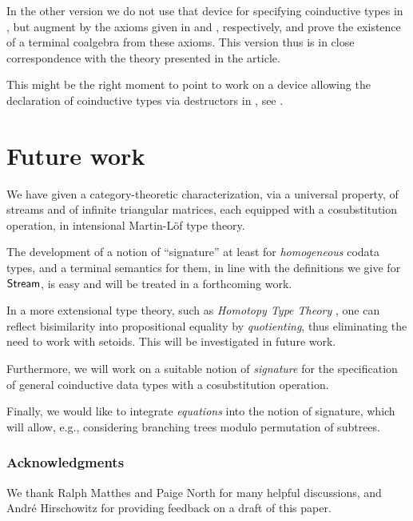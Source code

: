 \documentclass[envcountsame]{llncs}
\begin{document}
\begin{Long}
In the other version we do not use that device for specifying coinductive types in \coq, but augment \coq by the axioms given in  and ,
respectively, and prove the existence of a terminal coalgebra from these axioms.
This version thus is in close correspondence with the theory presented in the article.

This might be the right moment to point to work on a device allowing the declaration of coinductive types via destructors in \agda, 
see \parencite{DBLP:conf/popl/AbelPTS13}.

\end{Long}

\section{Future work}



We have given a category-theoretic characterization, via a universal property, of streams and of infinite triangular matrices,
each equipped with a cosubstitution operation,
in intensional Martin-L\"of type theory.

The development of a notion of \enquote{signature} at least for \emph{homogeneous} codata types, and 
a terminal semantics for them, in line with the definitions we give for $\mathsf{Stream}$, is easy
and will be treated in a forthcoming work.

In a more extensional type theory, such as \emph{Homotopy Type Theory} \parencite{hottbook}, 
one can reflect bisimilarity into propositional equality by \emph{quotienting},
thus eliminating the need to work with setoids.
This will be investigated in future work.

Furthermore, we will work on a suitable notion of \emph{signature} for the specification of general coinductive data types with
a cosubstitution operation.

Finally, we would like to integrate \emph{equations} into the notion of signature, which 
will allow, e.g., considering branching trees modulo permutation of subtrees.
 

\begin{Long}
 
\subsubsection*{Acknowledgments}
 We thank Ralph Matthes and Paige North for many helpful discussions, and Andr\'e Hirschowitz for providing feedback on
 a draft of this paper.

\end{Long}
 
\printbibliography


\appendix




 

% 
\end{document}
